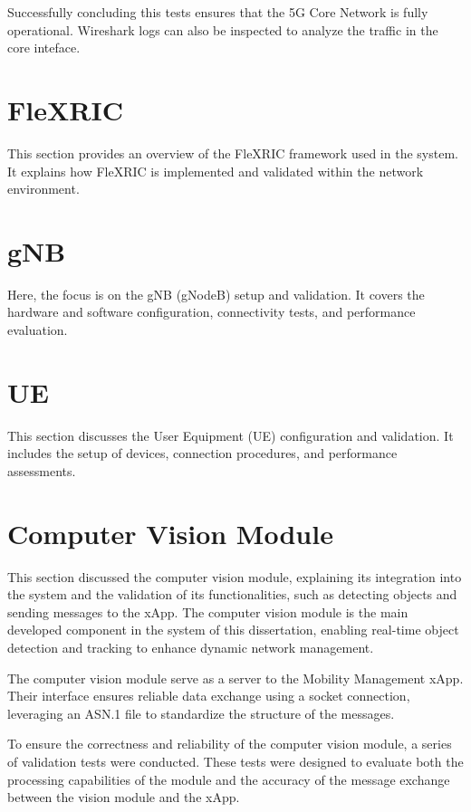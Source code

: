 

Successfully concluding this tests ensures that the 5G Core Network is fully operational.
Wireshark logs can also be inspected to analyze the traffic in the core inteface.



\section{FleXRIC}\label{sec:flexric}
This section provides an overview of the FleXRIC framework used in the system. It explains how FleXRIC is implemented and validated within the network environment.

\section{gNB}\label{sec:gnb}
Here, the focus is on the gNB (gNodeB) setup and validation. It covers the hardware and software configuration, connectivity tests, and performance evaluation.

\section{UE}\label{sec:ue}
This section discusses the User Equipment (UE) configuration and validation. It includes the setup of devices, connection procedures, and performance assessments.

\section{Computer Vision Module}\label{sec:cv_module}

This section discussed the computer vision module, explaining its integration into the system and the validation of its functionalities, such as detecting objects and sending messages to the xApp. The computer vision module is the main developed component in the system of this dissertation, enabling real-time object detection and tracking to enhance dynamic network management.

The computer vision module serve as a server to the Mobility Management xApp. Their interface ensures reliable data exchange using a socket connection, leveraging an ASN.1 file to standardize the structure of the messages. 

To ensure the correctness and reliability of the computer vision module, a series of validation tests were conducted. These tests were designed to evaluate both the processing capabilities of the module and the accuracy of the message exchange between the vision module and the xApp.

